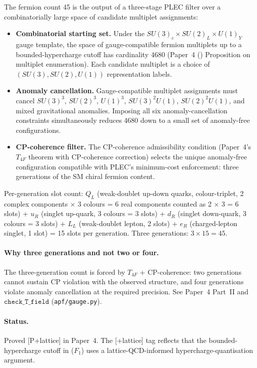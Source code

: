 \documentclass[11pt]{article}
\theoremstyle{plain}
\theoremstyle{definition}
\theoremstyle{remark}
\newcommand{\paperref}[2]{Paper~#1 (\emph{#2})}
\begin{document}
The fermion count 45 is the output of a three-stage PLEC filter over a combinatorially large space of candidate multiplet assignments:
\begin{itemize}[leftmargin=2em,itemsep=3pt]
  \item[($F_1$)] \textbf{Combinatorial starting set.}  Under the $SU(3)_c \times SU(2)_L \times U(1)_Y$ gauge template, the space of gauge-compatible fermion multiplets up to a bounded-hypercharge cutoff has cardinality 4680 (\paperref{4}{} Proposition on multiplet enumeration).  Each candidate multiplet is a choice of $(SU(3), SU(2), U(1))$ representation labels.
  \item[($F_2$)] \textbf{Anomaly cancellation.}  Gauge-compatible multiplet assignments must cancel $SU(3)^3$, $SU(2)^3$, $U(1)^3$, $SU(3)^2 U(1)$, $SU(2)^2 U(1)$, and mixed gravitational anomalies.  Imposing all six anomaly-cancellation constraints simultaneously reduces 4680 down to a small set of anomaly-free configurations.
  \item[($F_3$)] \textbf{CP-coherence filter.}  The CP-coherence admissibility condition (Paper~4's $T_{4F}$ theorem with CP-coherence correction) selects the unique anomaly-free configuration compatible with PLEC's minimum-cost enforcement: three generations of the SM chiral fermion content.
\end{itemize}
Per-generation slot count: $Q_L$ (weak-doublet up-down quarks, colour-triplet, 2 complex components × 3 colours = 6 real components counted as 2 × 3 = 6 slots) + $u_R$ (singlet up-quark, 3 colours = 3 slots) + $d_R$ (singlet down-quark, 3 colours = 3 slots) + $L_L$ (weak-doublet lepton, 2 slots) + $e_R$ (charged-lepton singlet, 1 slot) = 15 slots per generation.  Three generations: $3 \times 15 = 45$.

\paragraph{Why three generations and not two or four.}  The three-generation count is forced by $T_{4F}$ + CP-coherence: two generations cannot sustain CP violation with the observed structure, and four generations violate anomaly cancellation at the required precision.  See Paper~4 Part~II and $\texttt{check\_T\_field}$ (\texttt{apf/gauge.py}).

\paragraph{Status.}  Proved [P+lattice] in Paper~4.  The [+lattice] tag reflects that the bounded-hypercharge cutoff in ($F_1$) uses a lattice-QCD-informed hypercharge-quantisation argument.
\end{document}
